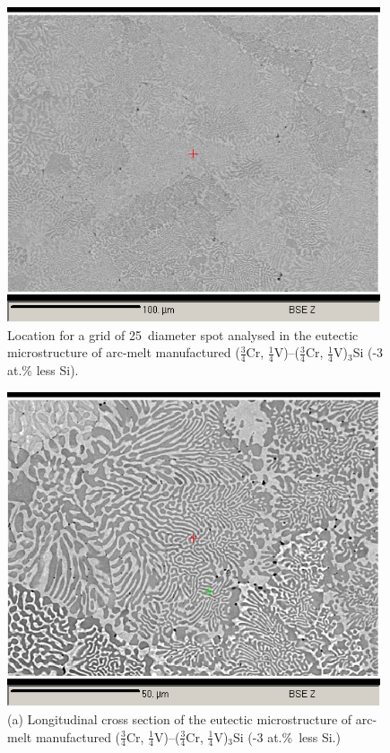%
\begin{figure}[H]
\begin{center}
\includegraphics[width=11cm]{Cr75less3Sigii}
\caption{Location for a grid of 25\micro\metre\ diameter spot analysed in the eutectic microstructure of arc-melt manufactured ($\frac{3}{4}$Cr, $\frac{1}{4}$V)--($\frac{3}{4}$Cr, $\frac{1}{4}$V)$_3$Si (-3 at.\% less Si).}
\label{fig:Cr75less3Sigii}
\end{center}
\end{figure}
%
%
\begin{figure}[H]
\begin{center}
\includegraphics[width=11cm]{_Sep6_75Cr_eut_scale_aug09.png}
\caption{(a) Longitudinal cross section of the eutectic microstructure of arc-melt manufactured ($\frac{3}{4}$Cr, $\frac{1}{4}$V)--($\frac{3}{4}$Cr, $\frac{1}{4}$V)$_3$Si (-3 at.\%\ less Si.)}
\label{fig:75CrlongiBSE}
\end{center}
\end{figure}
